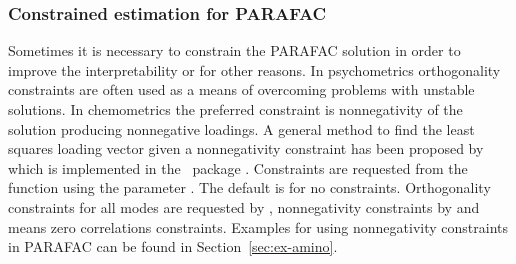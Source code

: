 \documentclass[article,shortnames, nojss]{jss}
\begin{document}
\subsubsection{Constrained estimation for PARAFAC}
Sometimes it is necessary to constrain the PARAFAC solution
in order to improve the interpretability or for other reasons.
In psychometrics orthogonality constraints are often used
as a means of overcoming  problems with unstable solutions. In
chemometrics the preferred constraint is nonnegativity of
the solution producing nonnegative loadings. A general method
to find the least squares  loading  vector given  a nonnegativity  constraint
has been proposed by \citet{lawson:nnls} which is implemented
in the ~package . Constraints are requested from
the  function using the parameter .
The default is  for no constraints. Orthogonality
constraints for all modes are requested by ,
nonnegativity constraints by  and
 means zero correlations constraints.
Examples for using nonnegativity constraints in PARAFAC
can be found in Section~\ref{sec:ex-amino}.
\end{document}
